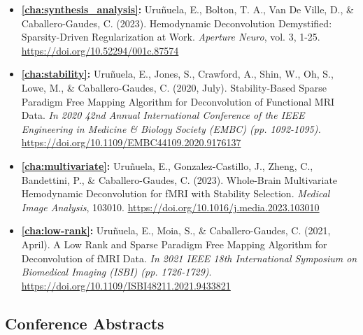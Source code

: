 \begin{itemize}
    \item {\textbf{\cref{cha:synthesis_analysis}:} Uruñuela, E., Bolton, T. A.,
    Van De Ville, D., \& Caballero-Gaudes, C. (2023). Hemodynamic Deconvolution
    Demystified: Sparsity-Driven Regularization at Work. \textit{Aperture
    Neuro}, vol. 3, 1-25. \url{https://doi.org/10.52294/001c.87574}}
    \item {\textbf{\cref{cha:stability}:} Uruñuela, E., Jones, S., Crawford, A.,
    Shin, W., Oh, S., Lowe, M., \& Caballero-Gaudes, C. (2020, July).
    Stability-Based Sparse Paradigm Free Mapping Algorithm for Deconvolution of
    Functional MRI Data. \textit{In 2020 42nd Annual International Conference of
    the IEEE Engineering in Medicine \& Biology Society (EMBC) (pp. 1092-1095).}
    \url{https://doi.org/10.1109/EMBC44109.2020.9176137}}
    \item {\textbf{\cref{cha:multivariate}:} Uruñuela, E., Gonzalez-Castillo,
    J., Zheng, C., Bandettini, P., \& Caballero-Gaudes, C. (2023). Whole-Brain
    Multivariate Hemodynamic Deconvolution for fMRI with Stability Selection.
    \textit{Medical Image Analysis}, 103010.
    \url{https://doi.org/10.1016/j.media.2023.103010}}
    \item {\textbf{\cref{cha:low-rank}:} Uruñuela, E., Moia, S., \&
    Caballero-Gaudes, C. (2021, April). A Low Rank and Sparse Paradigm Free Mapping
    Algorithm for Deconvolution of fMRI Data. \textit{In 2021 IEEE 18th
    International Symposium on Biomedical Imaging (ISBI) (pp. 1726-1729)}.
    \url{https://doi.org/10.1109/ISBI48211.2021.9433821}}
\end{itemize}

\subsection{Conference Abstracts}

